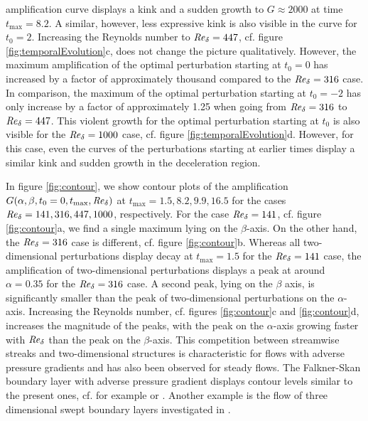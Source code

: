 \documentclass{jfm}
\newcommand\Rey{\mbox{\textit{Re}}}  %
\begin{document}
amplification curve displays 
a kink and a sudden growth to $ G \approx 2000 $ at time $ t_{\max} = 8.2 $. 
A similar, however, less expressive kink is also visible in the curve for
$ t_0 = 2 $. Increasing the Reynolds number to $ \Rey_\delta = 447 $,
cf. figure \ref{fig:temporalEvolution}c, does not change the picture
qualitatively. However, the maximum amplification of 
the optimal perturbation starting
at $ t_0 = 0 $ has increased
by a factor of approximately thousand
compared to the $ \Rey_\delta = 316 $ case. In comparison,
the maximum of
the optimal perturbation starting at $ t_0 = -2 $ has
only increase by a factor of approximately 1.25 when going
from $ \Rey_\delta = 316 $ to $ \Rey_\delta = 447 $. 
This violent growth for the optimal perturbation starting at $ t_0 $ is
also visible for the $ \Rey_\delta = 1000 $ case, cf. figure 
\ref{fig:temporalEvolution}d. However, for this case,
even the curves of
the perturbations
starting at earlier times display a similar kink and sudden growth
in the deceleration region. 

In figure \ref{fig:contour}, we show
contour plots of the amplification $ G(\alpha,\beta,t_0 = 0,t_{\max} , \Rey_\delta )$ at $ t_{\max} = 1.5, 8.2 , 9.9 , 16.5 $
for the cases $ \Rey_\delta = 141, 316, 447 , 1000 $, respectively. 
For the case $ \Rey_\delta = 141 $, cf. figure \ref{fig:contour}a, 
we find a single
maximum lying on the $ \beta $-axis. On the other hand,
the $ \Rey_\delta = 316 $ case
is different, cf. figure \ref{fig:contour}b. Whereas
all two-dimensional perturbations display decay at $ t_{\max} = 1.5 $ for
the $ \Rey_\delta = 141 $ case, the
amplification of two-dimensional perturbations displays a peak at around
$ \alpha = 0.35 $ for the $ \Rey_\delta = 316 $ case. A second peak,
lying on the $ \beta $ axis, is significantly smaller than the 
peak of two-dimensional perturbations on the $ \alpha $-axis. Increasing
the Reynolds number, cf. figures \ref{fig:contour}c and \ref{fig:contour}d, 
increases the magnitude of the peaks, with the peak on the $\alpha$-axis
growing faster with $ \Rey_\delta $ than the peak on the $ \beta$-axis. 
This competition between streamwise streaks and two-dimensional structures
is characteristic for flows with adverse pressure gradients
and has also been observed for steady flows. 
The Falkner-Skan boundary layer with adverse pressure
gradient displays contour levels similar
to the present ones, cf. for example \citet[figure 10d]{LevinHenningson2003}
or \citet{CorbettBottaro2000}. Another example is the flow of
three dimensional swept boundary layers investigated in 
\citet{CorbettBottaro2001}. 
\end{document}
